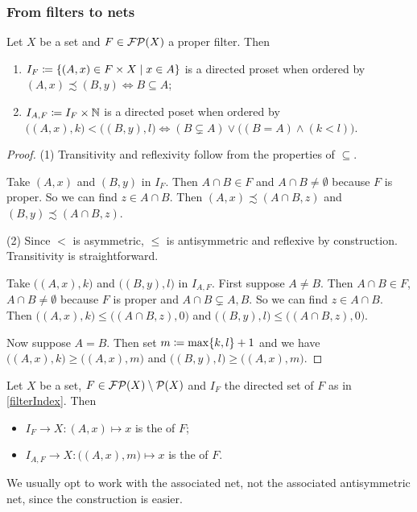 \subsubsection{From filters to nets}
\begin{lemma} \label{filterIndex}
Let $X$ be a set and $F\in\operatorname{\mathcal{FP}}(X)$ a proper filter. Then
\begin{enumerate}
\item $I_F \defeq \setbuilder{(A,x)\in F\times X}{x\in A}$
is a directed proset when ordered by $(A,x)\precsim (B,y) \iff B\subseteq A$;
\item $I_{A,F} \coloneqq I_F \times \mathbb{N}$ is a directed poset when ordered by $\big((A,x), k\big) < \big((B,y), l\big) \iff (B\subsetneq A)\lor \Big((B = A) \land (k < l)\Big)$.
\end{enumerate}
\end{lemma}
\begin{proof}
(1) Transitivity and reflexivity follow from the properties of $\subseteq$.

Take $(A,x)$ and $(B,y)$ in $I_F$. Then $A\cap B\in F$ and $A\cap B \neq \emptyset$ because $F$ is proper. So we can find $z\in A\cap B$. Then $(A,x) \precsim (A\cap B,z)$ and $(B,y) \precsim (A\cap B, z)$.

(2) Since $<$ is asymmetric, $\leq$ is antisymmetric and reflexive by construction. Transitivity is straightforward.

Take $\big((A,x), k\big)$ and $\big((B,y), l\big)$ in $I_{A,F}$.
First suppose $A\neq B$. Then $A\cap B\in F$, $A\cap B \neq \emptyset$ because $F$ is proper and $A\cap B \subsetneq A, B$. So we can find $z\in A\cap B$. Then $\big((A,x), k\big) \leq \big((A\cap B,z), 0 \big)$ and $\big((B,y), l\big) \leq \big((A\cap B,z), 0 \big)$.

Now suppose $A = B$. Then set $m \coloneqq \max\{k,l\}+1$ and we have $\big((A,x), k\big) \geq \big((A,x), m \big)$ and $\big((B,y), l\big) \geq \big((A,x), m \big)$.
\end{proof}

\begin{definition}
Let $X$ be a set, $F\in\operatorname{\mathcal{FP}}(X)\setminus\operatorname{\mathcal{P}}(X)$ and $I_F$ the directed set of $F$ as in \ref{filterIndex}. Then
\begin{itemize}
\item $I_F \to X: (A,x) \mapsto x$ is the  of $F$;
\item $I_{A,F} \to X: \big((A,x),m\big) \mapsto x$ is the  of $F$.
\end{itemize}
\end{definition}
We usually opt to work with the associated net, not the associated antisymmetric net, since the construction is easier.

